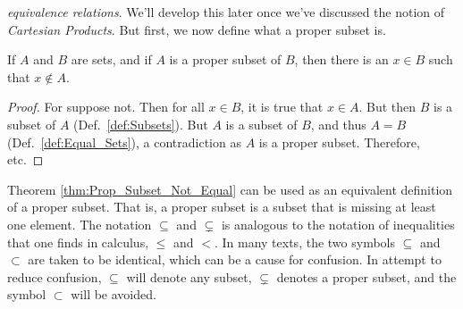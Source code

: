         \textit{equivalence relations}. We'll develop this later once
        we've discussed the notion of \textit{Cartesian Products}.
        But first, we now define what a proper subset is.
        \begin{theorem}
            \label{thm:Prop_Subset_Not_Equal}%
            If $A$ and $B$ are sets, and if $A$ is a proper
            subset of $B$, then there is an $x\in{B}$ such
            that $x\notin{A}$.
        \end{theorem}
        \begin{proof}
            For suppose not. Then for all $x\in{B}$,
            it is true that $x\in{A}$. But then
            $B$ is a subset of $A$ (Def.~\ref{def:Subsets}).
            But $A$ is a subset of $B$, and thus $A=B$
            (Def.~\ref{def:Equal_Sets}), a contradiction as
            $A$ is a proper subset. Therefore, etc.
        \end{proof}
        Theorem \ref{thm:Prop_Subset_Not_Equal} can
        be used as an equivalent definition of a proper
        subset. That is, a proper subset is a subset that
        is missing at least one element. The notation
        $\subseteq$ and $\subsetneq$ is analogous to the
        notation of inequalities that one finds in calculus,
        $\leq$ and $<$. In many texts, the two symbols
        $\subseteq$ and $\subset$ are taken to be identical,
        which can be a cause for confusion. In attempt to
        reduce confusion, $\subseteq$ will denote any subset,
        $\subsetneq$ denotes a proper subset, and the symbol
        $\subset$ will be avoided.
